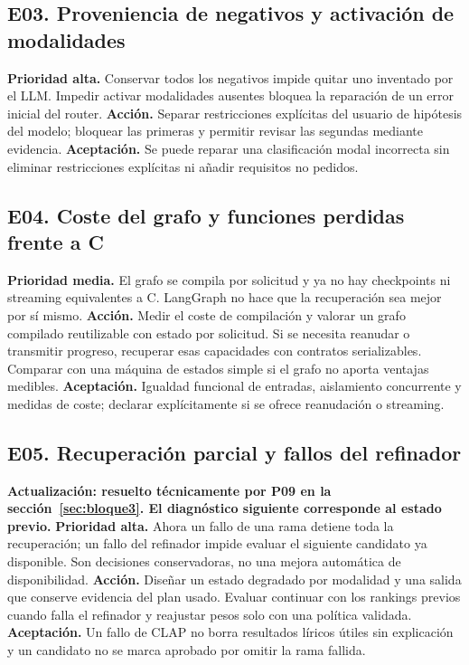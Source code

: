 \subsection{E03. Proveniencia de negativos y activación de modalidades}
\textbf{Prioridad alta.} Conservar todos los negativos impide quitar uno
inventado por el LLM. Impedir activar modalidades ausentes bloquea la reparación
de un error inicial del router.
\textbf{Acción.} Separar restricciones explícitas del usuario de hipótesis del
modelo; bloquear las primeras y permitir revisar las segundas mediante evidencia.
\textbf{Aceptación.} Se puede reparar una clasificación modal incorrecta sin
eliminar restricciones explícitas ni añadir requisitos no pedidos.

\subsection{E04. Coste del grafo y funciones perdidas frente a C}
\textbf{Prioridad media.} El grafo se compila por solicitud y ya no hay checkpoints
ni streaming equivalentes a C. LangGraph no hace que la recuperación sea mejor
por sí mismo.
\textbf{Acción.} Medir el coste de compilación y valorar un grafo compilado
reutilizable con estado por solicitud. Si se necesita reanudar o transmitir
progreso, recuperar esas capacidades con contratos serializables. Comparar con
una máquina de estados simple si el grafo no aporta ventajas medibles.
\textbf{Aceptación.} Igualdad funcional de entradas, aislamiento concurrente y
medidas de coste; declarar explícitamente si se ofrece reanudación o streaming.

\subsection{E05. Recuperación parcial y fallos del refinador}
\textbf{Actualización: resuelto técnicamente por P09 en la
sección~\ref{sec:bloque3}. El diagnóstico siguiente corresponde al estado previo.}
\textbf{Prioridad alta.} Ahora un fallo de una rama detiene toda la recuperación;
un fallo del refinador impide evaluar el siguiente candidato ya disponible.
Son decisiones conservadoras, no una mejora automática de disponibilidad.
\textbf{Acción.} Diseñar un estado degradado por modalidad y una salida que
conserve evidencia del plan usado. Evaluar continuar con los rankings previos
cuando falla el refinador y reajustar pesos solo con una política validada.
\textbf{Aceptación.} Un fallo de CLAP no borra resultados líricos útiles sin
explicación y un candidato no se marca aprobado por omitir la rama fallida.

